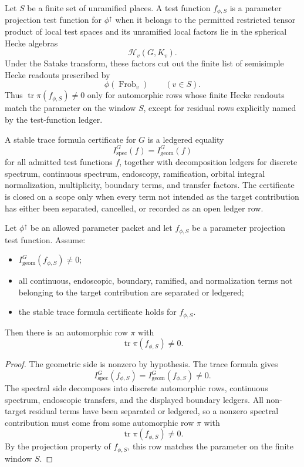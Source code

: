 \begin{definition}
\label{def:unified-reality-parameter-projection-test-function}
Let $S$ be a finite set of unramified places. A test function
$f_{\phi,S}$ is a parameter projection test function for
$\phi^{\uparrow}$ when it belongs to the permitted restricted tensor
product of local test spaces and its unramified local factors lie in the
spherical Hecke algebras
$$
\mathcal H_v(G,K_v).
$$
Under the Satake transform, these factors cut out the finite list of
semisimple Hecke readouts prescribed by
$$
\phi(\operatorname{Frob}_v)
\qquad
(v\in S).
$$
Thus $\operatorname{tr}\pi(f_{\phi,S})\ne0$ only for automorphic rows
whose finite Hecke readouts match the parameter on the window $S$,
except for residual rows explicitly named by the test-function ledger.
\end{definition}

\begin{definition}
\label{def:unified-reality-stable-trace-formula-certificate}
A stable trace formula certificate for $G$ is a ledgered equality
$$
I_{\mathrm{spec}}^G(f)=I_{\mathrm{geom}}^G(f)
$$
for all admitted test functions $f$, together with decomposition ledgers
for discrete spectrum, continuous spectrum, endoscopy, ramification,
orbital integral normalization, multiplicity, boundary terms, and
transfer factors. The certificate is closed on a scope only when every
term not intended as the target contribution has either been separated,
cancelled, or recorded as an open ledger row.
\end{definition}

\begin{theorem}
\label{thm:unified-reality-trace-formula-detects-automorphic-realization}
Let $\phi^{\uparrow}$ be an allowed parameter packet and let
$f_{\phi,S}$ be a parameter projection test function. Assume:
\begin{itemize}
\item $I_{\mathrm{geom}}^G(f_{\phi,S})\ne0$;
\item all continuous, endoscopic, boundary, ramified, and normalization
terms not belonging to the target contribution are separated or
ledgered;
\item the stable trace formula certificate holds for $f_{\phi,S}$.
\end{itemize}
Then there is an automorphic row $\pi$ with
$$
\operatorname{tr}\pi(f_{\phi,S})\ne0.
$$
\end{theorem}
\begin{proof}
The geometric side is nonzero by hypothesis. The trace formula gives
$$
I_{\mathrm{spec}}^G(f_{\phi,S})
=
I_{\mathrm{geom}}^G(f_{\phi,S})
\ne0.
$$
The spectral side decomposes into discrete automorphic rows, continuous
spectrum, endoscopic transfers, and the displayed boundary ledgers. All
non-target residual terms have been separated or ledgered, so a nonzero
spectral contribution must come from some automorphic row $\pi$ with
$$
\operatorname{tr}\pi(f_{\phi,S})\ne0.
$$
By the projection property of $f_{\phi,S}$, this row matches the
parameter on the finite window $S$.
\end{proof}


